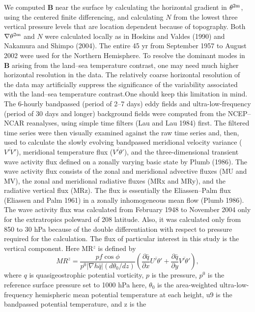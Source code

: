 \documentclass{ametsocv6.1}
\begin{document}
We computed $\mathbf{B}$ near the surface by calculating the
horizontal gradient in $\theta^{2{\textrm m}}$, using the centered finite differencing,
and calculating $N$ from the lowest three vertical
pressure levels that are location dependent because of
topography. Both $\nabla\theta^{2{\textrm m}}$ and $N$ were calculated locally as in
Hoskins and Valdes (1990) and Nakamura and Shimpo
(2004). The entire 45 yr from September 1957 to August
2002 were used for the Northern Hemisphere. To resolve
the dominant modes in $\mathbf{B}$ arising from the land--sea temperature
contrast, one may need much higher horizontal
resolution in the data. The relatively coarse horizontal
resolution of the data may artificially suppress the significance
of the variability associated with the land--sea temperature
contrast.One should keep this limitation in mind.
The 6-hourly bandpassed (period of 2--7 days) eddy
fields and ultra-low-frequency (period of 30 days and longer)
background fields were computed from the NCEP--
NCAR reanalyses, using simple time filters (Lau and Lau
1984) first. The filtered time series were then visually examined
against the raw time series and, then, used to calculate
the slowly evolving bandpassed meridional velocity
variance ($\overline{V'V'}$), meridional temperature flux ($\overline{V'\theta'}$), and
the three-dimensional transient wave activity flux defined
on a zonally varying basic state by Plumb (1986). The wave
activity flux consists of the zonal and meridional advective
fluxes (MU and MV), the zonal and meridional
radiative fluxes (MRx and MRy), and the radiative vertical
flux (MRz). The flux is essentially the Eliassen--Palm
flux (Eliassen and Palm 1961) in a zonally inhomogeneous
mean flow (Plumb 1986). The wave activity flux was calculated
from February 1948 to November 2004 only for
the extratropics poleward of 208 latitude. Also, it was
calculated only from 850 to 30 hPa because of the double
differentiation with respect to pressure required for the
calculation. The flux of particular interest in this study is
the vertical component. Here MR$^z$ is defined by
\[
MR^z=
\frac{
pf \cos\phi}
{p^0|\nabla h\bar q|(d\theta_0/dz)}
\left(\frac{\partial\bar q}{\partial x}
\overline{U'\theta'} +
\frac{\partial\bar q}{\partial y}
\overline{V'\theta'}\right), 
\]
where $q$ is quasigeostrophic potential vorticity, $p$ is the
pressure, $p^0$ is the reference surface pressure set to
1000 hPa here, $\theta_0$ is the area-weighted ultra-low-frequency
hemispheric mean potential temperature at each height,
u9 is the bandpassed potential temperature, and z is the
\end{document}

